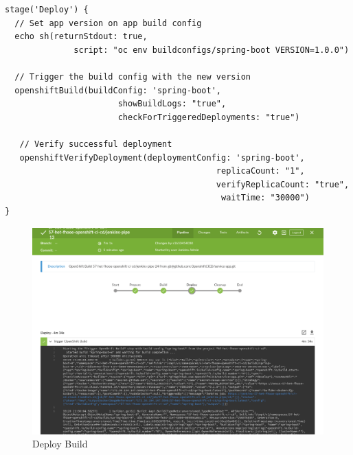 \begin{verbatim}
stage('Deploy') {
  // Set app version on app build config
  echo sh(returnStdout: true, 
              script: "oc env buildconfigs/spring-boot VERSION=1.0.0")

  // Trigger the build config with the new version
  openshiftBuild(buildConfig: 'spring-boot', 
                       showBuildLogs: "true", 
                       checkForTriggeredDeployments: "true")
                       
   // Verify successful deployment
   openshiftVerifyDeployment(deploymentConfig: 'spring-boot', 
                                           replicaCount: "1", 
                                           verifyReplicaCount: "true",
                                            waitTime: "30000")
}
\end{verbatim}

\begin{figure}[H]
	\centering
	\includegraphics[scale=0.3]{image/jenkins-deploy.png}
	\caption{Deploy Build}
	\label{fig:architecture}
\end{figure}